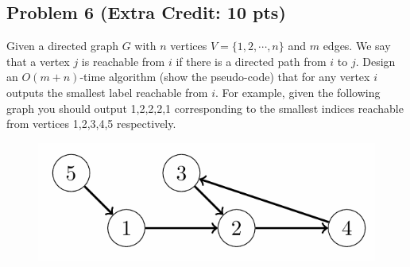 \documentclass[12pt]{article}
\begin{document}
\subsection*{Problem 6 (Extra Credit: 10 pts)}
Given a directed graph $G$ with $n$ vertices $V = \{1,2,\cdots,n\}$ and $m$ edges. We say that a vertex $j$ is reachable from $i$ if there is a directed path from $i$ to $j$. Design an $O(m+n)$-time algorithm (show the pseudo-code) that for any vertex $i$ outputs the smallest label reachable from $i$. For example, given the following graph you should output 1,2,2,2,1 corresponding to the smallest indices reachable from vertices 1,2,3,4,5 respectively.
\begin{figure}[H]
    \centering
    \includegraphics[width=0.5\linewidth]{P6.png}
    \label{fig:P6}
\end{figure}
\end{document}
